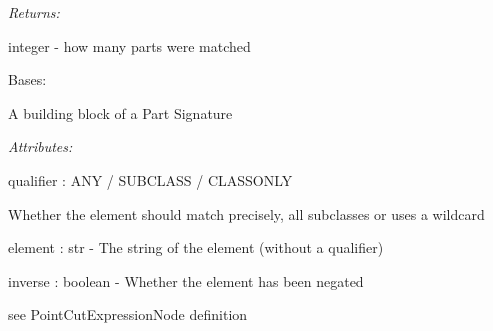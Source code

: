 \documentclass[letterpaper,10pt,english]{sphinxmanual}
\begin{document}
\begin{fulllineitems}
\begin{fulllineitems}
\begin{DUlineblock}{0em}
\item[] \emph{Returns:}
\item[]
\begin{DUlineblock}{\DUlineblockindent}
\item[] integer - how many parts were matched
\end{DUlineblock}
\end{DUlineblock}

\end{fulllineitems}


\end{fulllineitems}


\begin{fulllineitems}
\label{modules/index:aosb.core.PartSignatureElement}
Bases: 

A building block of a Part Signature

\begin{DUlineblock}{0em}
\item[] \emph{Attributes:}
\item[]
\begin{DUlineblock}{\DUlineblockindent}
\item[] qualifier : ANY / SUBCLASS / CLASSONLY
\item[]
\begin{DUlineblock}{\DUlineblockindent}
\item[] Whether the element should match precisely, all subclasses or uses a wildcard
\end{DUlineblock}
\item[] element : str - The string of the element (without a qualifier)
\item[] inverse : boolean - Whether the element has been negated
\end{DUlineblock}
\end{DUlineblock}

\begin{fulllineitems}
\label{modules/index:aosb.core.PartSignatureElement.match}
see PointCutExpressionNode definition

\end{fulllineitems}


\end{fulllineitems}
\end{document}
